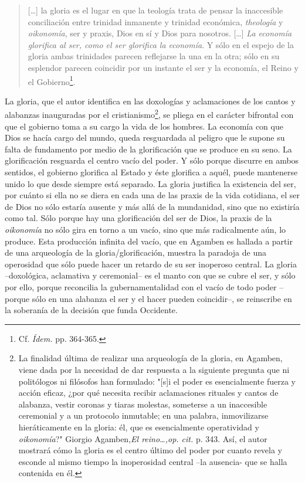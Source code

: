 \documentclass{book}
\begin{document}
\begin{quote}
{[}\ldots{]} la gloria es el lugar en que la teología trata de pensar la
inaccesible conciliación entre trinidad inmanente y trinidad económica,
\emph{theología} y \emph{oikonomía}, ser y praxis, Dios en sí y Dios
para nosotros. {[}\ldots{]} \emph{La economía glorifica al ser, como el
ser glorifica la economía}. Y sólo en el espejo de la gloria ambas
trinidades parecen reflejarse la una en la otra; sólo en su esplendor
parecen coincidir por un instante el ser y la economía, el Reino y el
Gobierno\footnote{Cf. \emph{Ídem.} pp. 364-365.}.
\end{quote}

La gloria, que el autor identifica en las doxologías y aclamaciones de
los cantos y alabanzas inauguradas por el cristianismo\footnote{La
  finalidad última de realizar una arqueología de la gloria, en Agamben,
  viene dada por la necesidad de dar respuesta a la siguiente pregunta
  que ni politólogos ni filósofos han formulado: "{[}s{]}i el poder es
  esencialmente fuerza y acción eficaz, ¿por qué necesita recibir
  aclamaciones rituales y cantos de alabanza, vestir coronas y tiaras
  molestas, someterse a un inaccesible ceremonial y a un protocolo
  inmutable; en una palabra, inmovilizarse hieráticamente en la gloria:
  él, que es esencialmente operatividad y \emph{oikonomía}?" Giorgio
  Agamben,\emph{El reino\ldots,op. cit.} p. 343. Así, el autor mostrará
  cómo la gloria es el centro último del poder por cuanto revela y
  esconde al mismo tiempo la inoperosidad central --la ausencia- que se
  halla contenida en él.}, se pliega en el carácter bifrontal con que el
gobierno toma a su cargo la vida de los hombres. La economía con que
Dios se hacía cargo del mundo, queda resguardada al peligro que le
supone su falta de fundamento por medio de la glorificación que se
produce en su seno. La glorificación resguarda el centro vacío del
poder. Y sólo porque discurre en ambos sentidos, el gobierno glorifica
al Estado y éste glorifica a aquél, puede mantenerse unido lo que desde
siempre está separado. La gloria justifica la existencia del ser, por
cuánto si ella no se diera en cada una de las praxis de la vida
cotidiana, el ser de Dios no sólo estaría ausente y más allá de la
mundanidad, sino que no existiría como tal. Sólo porque hay una
glorificación del ser de Dios, la praxis de la \emph{oikonomía} no sólo
gira en torno a un vacío, sino que más radicalmente aún, lo produce.
Esta producción infinita del vacío, que en Agamben es hallada a partir
de una arqueología de la gloria/glorificación, muestra la paradoja de
una operosidad que sólo puede hacer un retardo de su ser inoperoso
central. La gloria --doxológica, aclamativa y ceremonial-- es el manto
con que se cubre el ser, y sólo por ello, porque reconcilia la
gubernamentalidad con el vacío de todo poder --porque sólo en una
alabanza el ser y el hacer pueden coincidir--, se reinscribe en la
soberanía de la decisión que funda Occidente.
\end{document}
